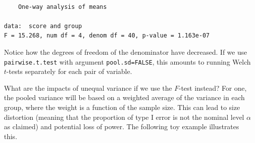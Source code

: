 \documentclass[
  11pt,
  letterpaper,
]{scrbook}
\theoremstyle{definition}
\theoremstyle{remark}
\begin{document}
\begin{verbatim}

    One-way analysis of means

data:  score and group
F = 15.268, num df = 4, denom df = 40, p-value = 1.163e-07
\end{verbatim}

Notice how the degrees of freedom of the denominator have decreased. If
we use \texttt{pairwise.t.test} with argument \texttt{pool.sd=FALSE},
this amounts to running Welch \(t\)-tests separately for each pair of
variable.

What are the impacts of unequal variance if we use the \(F\)-test
instead? For one, the pooled variance will be based on a weighted
average of the variance in each group, where the weight is a function of
the sample size. This can lead to size distortion (meaning that the
proportion of type I error is not the nominal level \(\alpha\) as
claimed) and potential loss of power. The following toy example
illustrates this.
\end{document}
